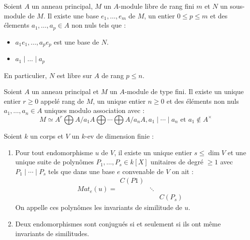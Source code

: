 \documentclass{cours}
\begin{document}
\begin{theorem}
    Soient $A$ un anneau principal, $M$ un $A$-module libre de rang fini $m$ et $N$ un sous-module de $M$. Il existe une base $e_{1}, \ldots, e_{m}$ de $M$, un entier $0 \leq p \leq m$ et des élements $a_{1}, \ldots, a_{p} \in A$ non nuls tels que :
    \begin{itemize}
        \item $a_{1}e_{1}, \ldots, a_{p}e_{p}$ est une base de $N$.
        \item $a_{1} \mid \ldots \mid a_{p}$
    \end{itemize}
    En particulier, $N$ est libre sur $A$ de rang $p \leq n$.
\end{theorem}

\begin{theorem}
    Soient $A$ un anneau principal et $M$ un $A$-module de type fini. Il existe un unique entier $r \geq 0$ appelé rang de $M$, un unique entier $n \geq 0$ et des éléments non nuls $a_{1}, \ldots, a_{n} \in A$ uniques modulo association avec :
    \[
        M \simeq A^{r} \bigoplus A/a_{1}A \bigoplus \cdots \bigoplus A/a_{n}A, a_{1} \mid \cdots \mid a_{n} \text{ et } a_{1} \notin A^{\times}
    \]
\end{theorem}

\begin{theorem}
    Soient $k$ un corps et $V$ un $k$-ev de dimension finie :
    \begin{enumerate}
        \item Pour tout endomorphisme $u$ de $V$, il existe un unique entier $s \leq \dim V$ et une unique suite de polynômes $P_{1}, \ldots, P_{s} \in k[X]$ unitaires de degré $\geq 1$ avec $P_{1} \mid \cdots \mid P_{s}$ tels que dans une base $e$ convenable de $V$ on ait :
              \[
                  Mat_{e}(u) = \begin{matrix}
                      C(P1) &        &          \\
                            & \ddots &          \\
                            &        & C(P_{s})
                  \end{matrix}
              \]
              On appelle ces polynômes les invariants de similitude de $u$.
        \item Deux endomorphismes sont conjugués si et seulement si ils ont même invariants de similitudes.
    \end{enumerate}
\end{theorem}
\end{document}
